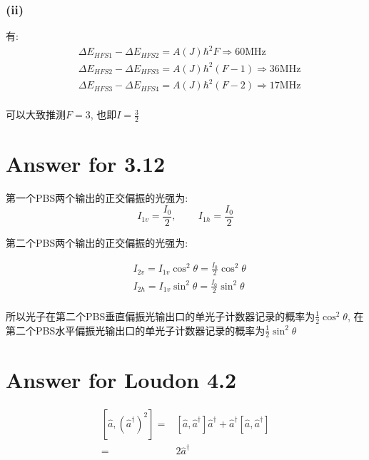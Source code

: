 \documentclass[twoside]{article}
\begin{document}
\subsubsection*{(ii)}

有:
\begin{align*}
     & \Delta E_{HFS1} - \Delta E_{HFS2} = A(J) \hbar^2 F \Rightarrow \text{60MHz}       \\
     & \Delta E_{HFS2} - \Delta E_{HFS3} = A(J) \hbar^2 (F - 1) \Rightarrow \text{36MHz} \\
     & \Delta E_{HFS3} - \Delta E_{HFS4} = A(J) \hbar^2 (F - 2) \Rightarrow \text{17MHz} \\
\end{align*}

可以大致推测$F = 3$, 也即$I = \frac{3}{2}$

\section*{Answer for 3.12}

第一个PBS两个输出的正交偏振的光强为:
$$
    I_{1v} = \frac{I_0}{2} \text{, }\qquad I_{1h} = \frac{I_0}{2}
$$

第二个PBS两个输出的正交偏振的光强为:

\begin{align*}
     & I_{2v} = I_{1v} \cos^2 \theta = \frac{I_0}{2} \cos^2 \theta \\
     & I_{2h} = I_{1v} \sin^2 \theta = \frac{I_0}{2} \sin^2 \theta \\
\end{align*}

所以光子在第二个PBS垂直偏振光输出口的单光子计数器记录的概率为$\frac{1}{2}\cos^2 \theta$, 在第二个PBS水平偏振光输出口的单光子计数器记录的概率为$\frac{1}{2} \sin^2 \theta$

\section*{Answer for Loudon 4.2}

\begin{equation*}
    \begin{split}
        \left[\hat{a}, \left(\hat{a}^{\dagger}\right)^2\right] = & \left[\hat{a}, \hat{a}^\dagger\right] \hat{a}^\dagger + \hat{a}^\dagger \left[\hat{a}, \hat{a}^\dagger\right] \\
        =                                                        & 2 \hat{a}^\dagger                                                                                             \\
    \end{split}
\end{equation*}
\end{document}
